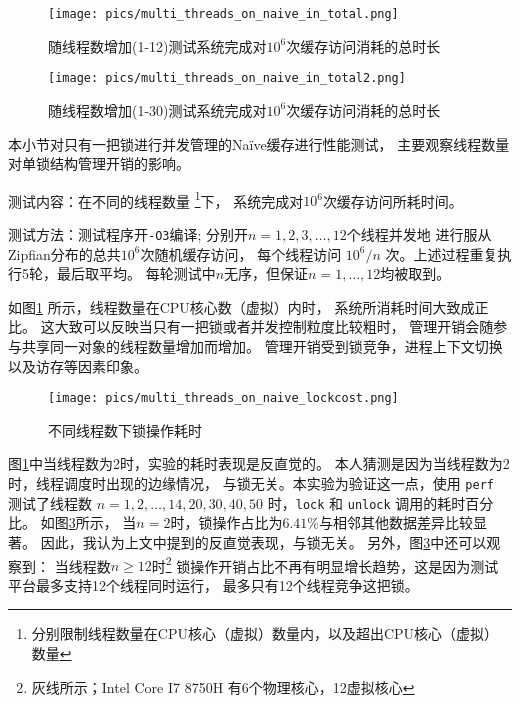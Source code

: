 \begin{figure}
    \centering
    \texttt{[image: pics/multi\_threads\_on\_naive\_in\_total.png]}
    \caption{随线程数增加(1-12)测试系统完成对$10^6$次缓存访问消耗的总时长}
    \label{fig:multi-thread-naive-in-total}
\end{figure}

\begin{figure}
    \centering
    \texttt{[image: pics/multi\_threads\_on\_naive\_in\_total2.png]}
    \caption{随线程数增加(1-30)测试系统完成对$10^6$次缓存访问消耗的总时长}
    \label{fig:multi-thread-naive-in-total-2}
\end{figure}

本小节对只有一把锁进行并发管理的Na\"{i}ve缓存进行性能测试，
主要观察线程数量对单锁结构管理开销的影响。

测试内容：在不同的线程数量
\footnote{分别限制线程数量在CPU核心（虚拟）数量内，以及超出CPU核心（虚拟）数量}下，
系统完成对$10^6$次缓存访问所耗时间。

测试方法：测试程序开\verb|-O3|编译;
分别开$n = 1, 2, 3, \dots, 12$个线程并发地
进行服从Zipfian分布的总共$10^6$次随机缓存访问，
每个线程访问 $10^6 / n$ 次。上述过程重复执行5轮，最后取平均。
每轮测试中$n$无序，但保证$n = 1, \dots, 12$均被取到。

如图\ref{fig:multi-thread-naive-in-total} 所示，线程数量在CPU核心数（虚拟）内时，
系统所消耗时间大致成正比。
这大致可以反映当只有一把锁或者并发控制粒度比较粗时，
管理开销会随参与共享同一对象的线程数量增加而增加。
管理开销受到锁竞争，进程上下文切换以及访存等因素印象。

\begin{figure}
    \centering
    \texttt{[image: pics/multi\_threads\_on\_naive\_lockcost.png]}
    \caption{不同线程数下锁操作耗时}
    \label{fig:multi-thread-naive-lockcost}
\end{figure}

图\ref{fig:multi-thread-naive-in-total}中当线程数为2时，实验的耗时表现是反直觉的。
本人猜测是因为当线程数为2时，线程调度时出现的边缘情况，
与锁无关。本实验为验证这一点，使用 \verb|perf| 测试了线程数
$\allowbreak n = 1, 2, \dots, 14, 20, 30, 40, 50$
时，\verb|lock| 和 \verb|unlock| 调用的耗时百分比。
如图\ref{fig:multi-thread-naive-lockcost}所示，
当$n=2$时，锁操作占比为$6.41\%$与相邻其他数据差异比较显著。
因此，我认为上文中提到的反直觉表现，与锁无关。
另外，图\ref{fig:multi-thread-naive-lockcost}中还可以观察到：
当线程数$n \geq 12$时\footnote{灰线所示；Intel Core I7 8750H 有6个物理核心，12虚拟核心}
锁操作开销占比不再有明显增长趋势，这是因为测试平台最多支持12个线程同时运行，
最多只有12个线程竞争这把锁。

